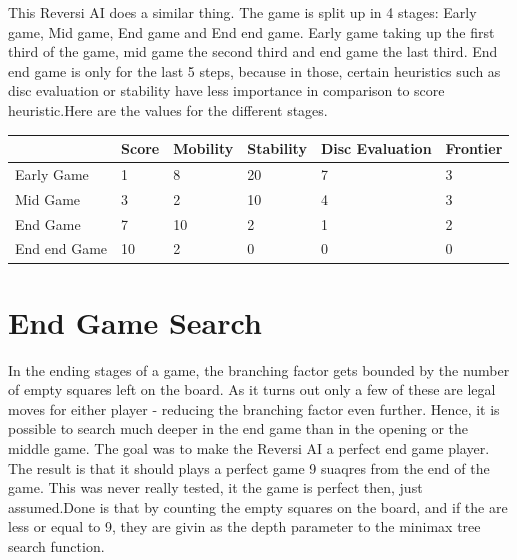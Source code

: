 This Reversi AI does a similar thing. The game is split up in 4 stages: Early game, Mid game, End game and End end game. Early game taking up the first third of the game, mid game the second third and end game the last third. End end game is only for the last 5 steps, because in those, certain heuristics such as disc evaluation or stability have less importance in comparison to score heuristic.\newline Here are the values for the different stages.
\begin{center}
	\begin{tabular}{ | m{3cm} | m{1.5cm}| m{1.5cm} | m{1.5cm}| m{3cm} | m{1.5cm} |} 
		\hline
		& Score & Mobility & Stability & Disc Evaluation & Frontier \\ 
		\hline
		Early Game & 1 & 8 & 20 & 7 & 3 \\ 
		\hline
		Mid Game & 3 & 2 & 10 & 4 & 3\\ 
		\hline
		End Game & 7 & 10 & 2 & 1 & 2\\ 
		\hline
		End end Game & 10 & 2 & 0 & 0 & 0\\ 
		\hline
	\end{tabular}
\end{center}
\section{End Game Search}
In the ending stages of a game, the branching factor gets bounded by the number of empty squares left on the board. As it turns out only a few of these are legal moves for either player - reducing the branching factor even further. Hence, it is possible to search much deeper in the end game than in the opening or the middle game. The goal was to make the Reversi AI a perfect end game player. The result is that it should plays a perfect game 9 suaqres from the end of the game. This was never really tested, it the game is perfect then, just assumed.\newline Done is that by counting the empty squares on the board, and if the are less or equal to 9, they are givin as the depth parameter to the minimax tree search function.

